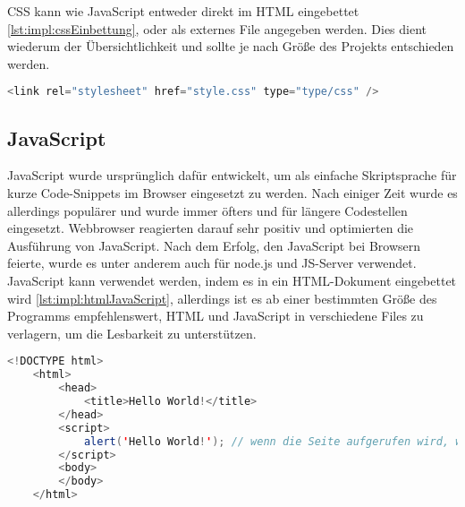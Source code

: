 CSS kann wie JavaScript entweder direkt im HTML eingebettet \ref{lst:impl:cssEinbettung}, oder als externes File angegeben werden. Dies dient wiederum der Übersichtlichkeit und sollte je nach Größe des Projekts entschieden werden.
\cite{durchstartenHTML}

\begin{lstlisting}[language=java,caption=CSS Einbettung,label=lst:impl:cssEinbettung]
    <link rel="stylesheet" href="style.css" type="type/css" />
\end{lstlisting}
 
\subsection{JavaScript}
JavaScript wurde ursprünglich dafür entwickelt, um als einfache Skriptsprache für kurze Code-Snippets im Browser eingesetzt zu werden. Nach einiger Zeit wurde es allerdings populärer und wurde immer öfters und für längere Codestellen eingesetzt. Webbrowser reagierten darauf sehr positiv und optimierten die Ausführung von JavaScript. Nach dem Erfolg, den JavaScript bei Browsern feierte, wurde es unter anderem auch für node.js und JS-Server verwendet.
\cite{typeJavaScript}
JavaScript kann verwendet werden, indem es in ein HTML-Dokument eingebettet wird \ref{lst:impl:htmlJavaScript}, allerdings ist es ab einer bestimmten Größe des Programms empfehlenswert, HTML und JavaScript in verschiedene Files zu verlagern, um die Lesbarkeit zu unterstützen.
\cite{JavaScriptJavaEntwickler} 

\begin{lstlisting}[language=java,caption=HTML mit eingebettetem JavaScript,label=lst:impl:htmlJavaScript]
    <!DOCTYPE html>
    <html>
        <head>
            <title>Hello World!</title>
        </head>
        <script>
            alert('Hello World!'); // wenn die Seite aufgerufen wird, wird mithilfe von JavaScript ein Alert-Fenster mit 'Hello World!' ausgegeben
        </script>
        <body>
        </body>
    </html>
\end{lstlisting}